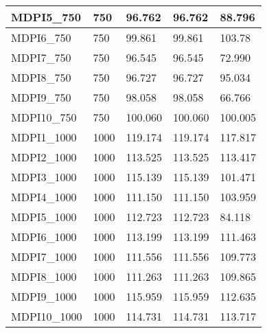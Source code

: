 \begin{center}
\begin{tabular}{ l|l|l|l|l }
    MDPI5\_750 & 750 & 96.762 & 96.762 & 88.796 \\ \hline
    MDPI6\_750 & 750 & 99.861 & 99.861 & 103.78 \\ \hline
    MDPI7\_750 & 750 & 96.545 & 96.545 & 72.990 \\ \hline
    MDPI8\_750 & 750 & 96.727 & 96.727 & 95.034 \\ \hline
    MDPI9\_750 & 750 & 98.058 & 98.058 & 66.766 \\ \hline
    MDPI10\_750 & 750 & 100.060 & 100.060 & 100.005 \\ \hline
    \hline
    MDPI1\_1000 & 1000 & 119.174 & 119.174 & 117.817 \\ \hline
    MDPI2\_1000 & 1000 & 113.525 & 113.525 & 113.417 \\ \hline
    MDPI3\_1000 & 1000 & 115.139 & 115.139 & 101.471 \\ \hline
    MDPI4\_1000 & 1000 & 111.150 & 111.150 & 103.959 \\ \hline
    MDPI5\_1000 & 1000 & 112.723 & 112.723 & 84.118 \\ \hline
    MDPI6\_1000 & 1000 & 113.199 & 113.199 & 111.463 \\ \hline
    MDPI7\_1000 & 1000 & 111.556 & 111.556 & 109.773 \\ \hline
    MDPI8\_1000 & 1000 & 111.263 & 111.263 & 109.865 \\ \hline
    MDPI9\_1000 & 1000 & 115.959 & 115.959 & 112.635 \\ \hline
    MDPI10\_1000 & 1000 & 114.731 & 114.731 & 113.717 \\ \hline
    \hline

  \end{tabular}
\end{center}
